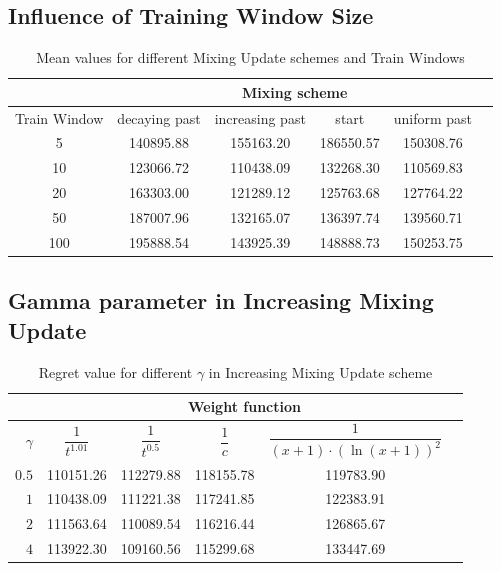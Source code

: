 \documentclass[12pt, twoside]{article}
\begin{document}
\subsection{Influence of Training Window Size}


\begin{table}[h]
\centering
\caption{Mean values for different Mixing Update schemes and Train Windows}
\label{tab:mean_values}

\begin{tabular}{c|ccccc}
\toprule
& \multicolumn{4}{c}{Mixing scheme} \\
\toprule
{Train Window} & decaying past & increasing past & start & uniform past & \\
\midrule
5 & 140895.88 & 155163.20 & 186550.57 & 150308.76 \\
10 & 123066.72 & 110438.09 & 132268.30 & 110569.83 \\
20 & 163303.00 & 121289.12 & 125763.68 & 127764.22 \\
50 & 187007.96 & 132165.07 & 136397.74 & 139560.71 \\
100 & 195888.54 & 143925.39 & 148888.73 & 150253.75 \\
\bottomrule
\end{tabular}
\end{table}



\subsection{Gamma parameter in  Increasing Mixing Update}

\begin{table}[h]
\centering
\caption{Regret value for different $\gamma$ in Increasing Mixing Update scheme}
\begin{tabular}{r|ccccc}
\toprule
 & \multicolumn{4}{c}{Weight function} \\
\toprule
{$\gamma$} &
\centering $\dfrac{1}{t^{1.01}}$ &
\centering $\dfrac{1}{t^{0.5}}$ &
\centering $\dfrac{1}{c}$ &
\centering $\dfrac{1}{{(x+1)\cdot(\ln(x+1))^{2}}}$ \tabularnewline
\midrule
$0.5$ & 110151.26 & 112279.88 & 118155.78 & 119783.90 \\
$1$ & 110438.09 & 111221.38 & 117241.85 & 122383.91 \\
$2$ & 111563.64 & 110089.54 & 116216.44 & 126865.67 \\
$4$ & 113922.30 & 109160.56 & 115299.68 & 133447.69 \\
\bottomrule
\end{tabular}
\end{table}
\end{document}
